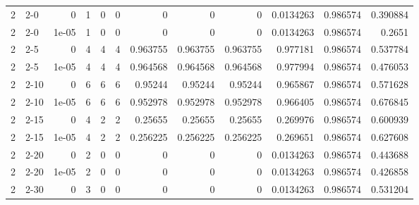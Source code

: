 \begin{tabular}{rlrrrrrrrrrr}
     2 & 2-0    &      0     &           1 &                 0 &                 0 &     0           &     0           &      0           &        0.0134263 &               0.986574 &           0.390884 \\
     2 & 2-0    &      1e-05 &           1 &                 0 &                 0 &     0           &     0           &      0           &        0.0134263 &               0.986574 &           0.2651   \\
     2 & 2-5    &      0     &           4 &                 4 &                 4 &     0.963755    &     0.963755    &      0.963755    &        0.977181  &               0.986574 &           0.537784 \\
     2 & 2-5    &      1e-05 &           4 &                 4 &                 4 &     0.964568    &     0.964568    &      0.964568    &        0.977994  &               0.986574 &           0.476053 \\
     2 & 2-10   &      0     &           6 &                 6 &                 6 &     0.95244     &     0.95244     &      0.95244     &        0.965867  &               0.986574 &           0.571628 \\
     2 & 2-10   &      1e-05 &           6 &                 6 &                 6 &     0.952978    &     0.952978    &      0.952978    &        0.966405  &               0.986574 &           0.676845 \\
     2 & 2-15   &      0     &           4 &                 2 &                 2 &     0.25655     &     0.25655     &      0.25655     &        0.269976  &               0.986574 &           0.600939 \\
     2 & 2-15   &      1e-05 &           4 &                 2 &                 2 &     0.256225    &     0.256225    &      0.256225    &        0.269651  &               0.986574 &           0.627608 \\
     2 & 2-20   &      0     &           2 &                 0 &                 0 &     0           &     0           &      0           &        0.0134263 &               0.986574 &           0.443688 \\
     2 & 2-20   &      1e-05 &           2 &                 0 &                 0 &     0           &     0           &      0           &        0.0134263 &               0.986574 &           0.426858 \\
     2 & 2-30   &      0     &           3 &                 0 &                 0 &     0           &     0           &      0           &        0.0134263 &               0.986574 &           0.531204 \\

\end{tabular}
